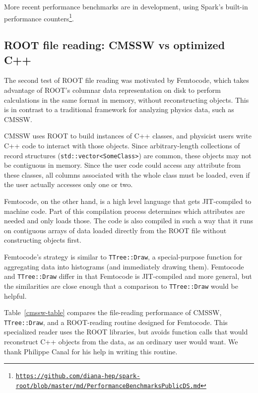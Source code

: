 \documentclass[12pt]{article}
\begin{document}
More recent performance benchmarks are in development, using Spark's built-in performance counters\footnote{\href{https://github.com/diana-hep/spark-root/blob/master/md/PerformanceBenchmarksPublicDS.md}{\tt https://github.com/diana-hep/spark-root/blob/master/md/PerformanceBenchmarksPublicDS.md}}.

\subsection*{ROOT file reading: CMSSW vs optimized C++}

The second test of ROOT file reading was motivated by Femtocode, which takes advantage of ROOT's columnar data representation on disk to perform calculations in the same format in memory, without reconstructing objects. This is in contrast to a traditional framework for analyzing physics data, such as CMSSW.

CMSSW uses ROOT to build instances of C++ classes, and physicist users write C++ code to interact with those objects. Since arbitrary-length collections of record structures ({\tt std::vector<SomeClass>}) are common, these objects may not be contiguous in memory. Since the user code could access any attribute from these classes, all columns associated with the whole class must be loaded, even if the user actually accesses only one or two.

Femtocode, on the other hand, is a high level language that gets JIT-compiled to machine code. Part of this compilation process determines which attributes are needed and only loads those. The code is also compiled in such a way that it runs on contiguous arrays of data loaded directly from the ROOT file without constructing objects first.

Femtocode's strategy is similar to {\tt TTree::Draw}, a special-purpose function for aggregating data into histograms (and immediately drawing them). Femtocode and {\tt TTree::Draw} differ in that Femtocode is JIT-compiled and more general, but the similarities are close enough that a comparison to {\tt TTree::Draw} would be helpful.

Table~\ref{cmssw-table} compares the file-reading performance of CMSSW, {\tt TTree::Draw}, and a ROOT-reading routine designed for Femtocode. This specialized reader uses the ROOT libraries, but avoids function calls that would reconstruct C++ objects from the data, as an ordinary user would want. We thank Philippe Canal for his help in writing this routine.
\end{document}
